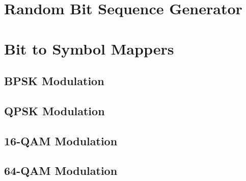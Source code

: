 \documentclass[]{article}
\begin{document}
\appendix
\newpage


\newpage
%


\section{Random Bit Sequence Generator}
\label{app:random_bit_generator}


\section{Bit to Symbol Mappers}
\label{app:bittosym}
\subsection{BPSK Modulation }
\label{app:bpsk_mod}
%



\subsection{QPSK Modulation}
\label{app:qpsk_mod}


\subsection{16-QAM Modulation}
\label{app:qam_16_mod}



\subsection{64-QAM Modulation }
\label{app:qam_64_mod}

\end{document}
